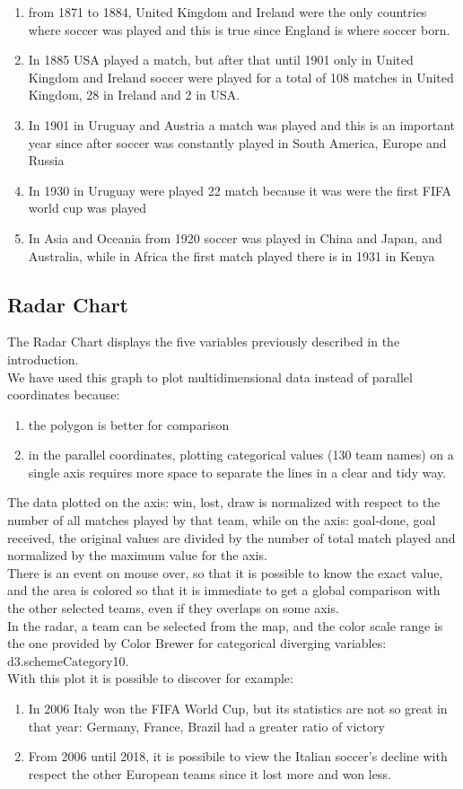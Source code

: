 \documentclass[journal]{vgtc}                %
\begin{document}
\begin{enumerate}
\item from 1871 to 1884, United Kingdom and Ireland were the only countries where soccer was played and this is true since England is where soccer born.
\item In 1885 USA played a match, but after that until 1901 only in United Kingdom and Ireland soccer were played for a total of 108 matches in United Kingdom, 28 in Ireland and 2 in USA.
\item In 1901 in Uruguay and Austria a match was played and this is an important year since after soccer was constantly played in South America, Europe and Russia
\item In 1930 in Uruguay were played 22 match because it was were the first FIFA world cup was played
\item In Asia and Oceania from 1920 soccer was played in China and Japan, and Australia, while in Africa the first match played there is in 1931 in Kenya
\end{enumerate}
\subsection{Radar Chart}
The Radar Chart displays the five variables previously described in the introduction.\\We have used this graph to plot multidimensional data instead of parallel coordinates because:
\begin{enumerate}
\item the polygon is better for comparison
\item in the parallel coordinates, plotting categorical values (130 team names) on a single axis requires more space to separate the lines in a clear and tidy way.
\end{enumerate}
The data plotted on the axis: win, lost, draw is normalized with respect to the number of all matches played by that team, while on the axis: goal-done, goal received, the original values are divided by the number of total match played and normalized by the maximum value for the axis.\\There is an event on mouse over, so that it is possible to know the exact value, and the area is colored so that it is immediate to get a global comparison with the other selected teams, even if they overlaps on some axis.\\In the radar, a team can be selected from the map, and the color scale range is the one provided by Color Brewer for categorical diverging variables: d3.schemeCategory10.\\With this plot it is possible to discover for example:
\begin{enumerate}
\item In 2006 Italy won the FIFA World Cup, but its statistics are not so great in that year: Germany, France, Brazil had a greater ratio of victory 
\item From 2006 until 2018, it is possibile to view the Italian soccer's decline with respect the other European teams since it lost more and won less.
\end{enumerate}
\end{document}
